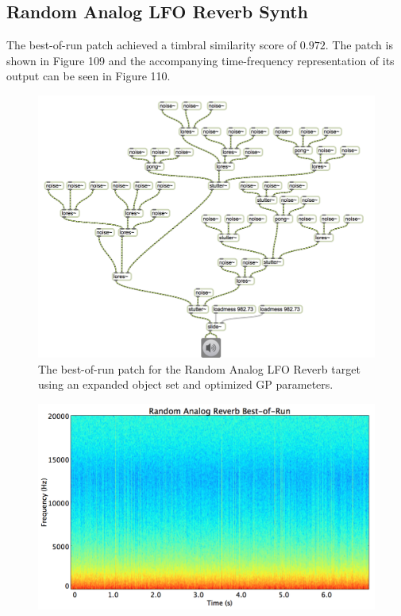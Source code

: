 \documentclass[12pt]{report} 	%
\numberwithin{figure}{chapter}
\numberwithin{table}{chapter}
\numberwithin{equation}{chapter}
\begin{document}
\begin{flushleft}
\subsection{Random Analog LFO Reverb Synth}

The best-of-run patch achieved a timbral similarity score of $0.972$. The patch is shown in Figure 109 and the accompanying time-frequency representation of its output can be seen in Figure 110.
\begin{figure}[h!]
\begin{center}
\includegraphics[angle=270, scale=0.65]{RandomAnalog_Best}
\caption[Random analog LFO reverb best-of-run patch]{The best-of-run patch for the Random Analog LFO Reverb target using an expanded object set and optimized GP parameters.}
\end{center}
\end{figure}
\begin{figure}[h!]
\begin{center}
\includegraphics[scale=0.35,width=\linewidth]{RandomAnalogReverbBestOfRunSTFT}

\end{center}
\end{figure}
\end{flushleft}
\end{document}
